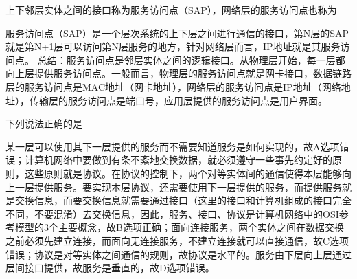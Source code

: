 \question 上下邻层实体之间的接口称为服务访问点（SAP），网络层的服务访问点也称为
\par{}
\begin{solution}服务访问点（SAP）是一个层次系统的上下层之间进行通信的接口，第N层的SAP就是第N+1层可以访问第N层服务的地方，针对网络层而言，IP地址就是其服务访问点。
总结：服务访问点是邻层实体之间的逻辑接口。从物理层开始，每一层都向上层提供服务访问点。一般而言，物理层的服务访问点就是网卡接口，数据链路层的服务访问点是MAC地址（网卡地址），网络层的服务访问点是IP地址（网络地址），传输层的服务访问点是端口号，应用层提供的服务访问点是用户界面。
\end{solution}
\question 下列说法正确的是
\par{}
\begin{solution}某一层可以使用其下一层提供的服务而不需要知道服务是如何实现的，故A选项错误；计算机网络中要做到有条不紊地交换数据，就必须遵守一些事先约定好的原则，这些原则就是协议。在协议的控制下，两个对等实体间的通信使得本层能够向上一层提供服务。要实现本层协议，还需要使用下一层提供的服务，而提供服务就是交换信息，而要交换信息就需要通过接口（这里的接口和计算机组成的接口完全不同，不要混淆）去交换信息，因此，服务、接口、协议是计算机网络中的OSI参考模型的3个主要概念，故B选项正确；面向连接服务，两个实体之间在数据交换之前必须先建立连接，而面向无连接服务，不建立连接就可以直接通信，故C选项错误；协议是对等实体之间通信的规则，故协议是水平的。服务由下层向上层通过层间接口提供，故服务是垂直的，故D选项错误。
\end{solution}
